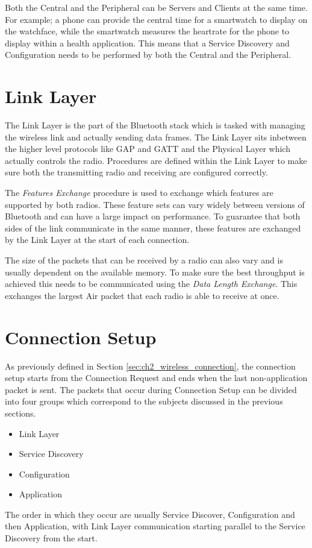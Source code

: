 Both the Central and the Peripheral can be Servers and Clients at the same time. For example; a phone can provide the central time for a smartwatch to display on the watchface, while the smartwatch measures the heartrate for the phone to display within a health application. This means that a Service Discovery and Configuration needs to be performed by both the Central and the Peripheral.

\section{Link Layer}
The Link Layer is the part of the Bluetooth stack which is tasked with managing the wireless link and actually sending data frames. The Link Layer sits inbetween the higher level protocols like GAP and GATT and the Physical Layer which actually controls the radio.
Procedures are defined within the Link Layer to make sure both the transmitting radio and receiving are configured correctly.

The \textit{Features Exchange} procedure is used to exchange which features are supported by both radios. These feature sets can vary widely between versions of Bluetooth and can have a large impact on performance. To guarantee that both sides of the link communicate in the same manner, these features are exchanged by the Link Layer at the start of each connection.

The size of the packets that can be received by a radio can also vary and is usually dependent on the available memory. To make sure the best throughput is achieved this needs to be communicated using the \textit{Data Length Exchange}. This exchanges the largest Air packet that each radio is able to receive at once.

\section{Connection Setup}
As previously defined in Section \ref{sec:ch2_wireless_connection}, the connection setup starts from the Connection Request and ends when the last non-application packet is sent. The packets that occur during Connection Setup can be divided into four groups which correspond to the subjects discussed in the previous sections.
\begin{itemize}
    \item Link Layer
    \item Service Discovery
    \item Configuration
    \item Application
\end{itemize} 
The order in which they occur are usually Service Discover, Configuration and then Application, with Link Layer communication starting parallel to the Service Discovery from the start.